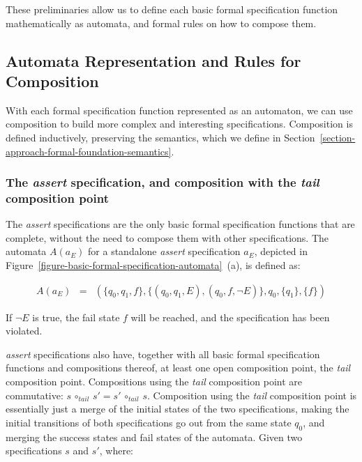 

These preliminaries allow us to define each basic formal specification function
mathematically as automata, and formal rules on how to compose them.



\subsection{Automata Representation and Rules for Composition}
\label{section-approach-composition}
\lstset{language=Python,numbers=none}

With each formal specification function represented as an automaton, we can use
composition to build more complex and interesting specifications. Composition
is defined inductively, preserving the semantics, which we define in
Section~\ref{section-approach-formal-foundation-semantics}.

\subsubsection{The \textit{assert} specification, and composition with the
\textit{tail} composition point}

The \textit{assert} specifications are the only basic formal specification
functions that are complete, without the need to compose them with other
specifications. The automata $A(a_E)$ for a standalone \textit{assert}
specification $a_E$, depicted in
Figure~\ref{figure-basic-formal-specification-automata}~(a), is defined as:

\medskip
\[
  \begin{array}{rcl}
    A(a_E) & = & (\{q_0, q_1, f\}, \{(q_0, q_1, E), (q_0, f, \neg E)\}, q_0, \{q_1\}, \{f\})
  \end{array}
\]
\medskip

If $\neg E$ is true, the fail state $f$ will be reached, and the specification
has been violated.

\textit{assert} specifications also have, together with all basic formal
specification functions and compositions thereof, at least one open composition
point, the \textit{tail} composition point. Compositions using the
\textit{tail} composition point are commutative: $s \, \circ_{tail} \, s' = s'
\, \circ_{tail} \, s$. Composition using the \textit{tail} composition point is
essentially just a merge of the initial states of the two specifications,
making the initial transitions of both specifications go out from the same
state $q_0$, and merging the success states and fail states of the automata. Given two
specifications $s$ and $s'$, where:

